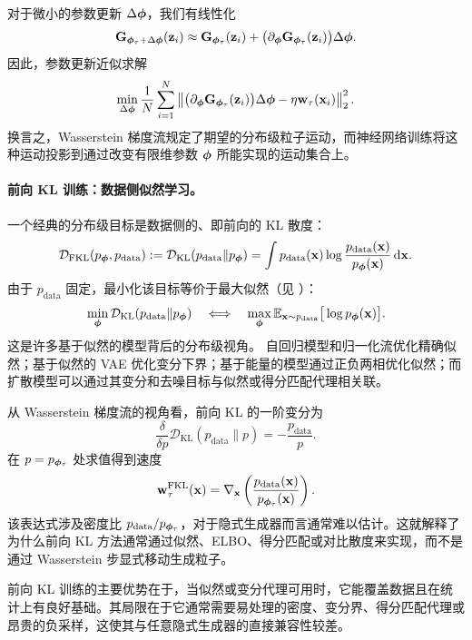 对于微小的参数更新 $\Delta{\bm{\phi}}$，我们有线性化
\[
    {\mathbf{G}}_{{\bm{\phi}}_\tau+\Delta{\bm{\phi}}}({\mathbf{z}}_i)
    \approx
    {\mathbf{G}}_{{\bm{\phi}}_\tau}({\mathbf{z}}_i)
    +
    \big(\partial_{{\bm{\phi}}}{\mathbf{G}}_{{\bm{\phi}}_\tau}({\mathbf{z}}_i)\big)\Delta{\bm{\phi}}.
\]
因此，参数更新近似求解
\[
    \min_{\Delta{\bm{\phi}}}
    \frac{1}{N}
    \sum_{i=1}^N
    \left\|
        \big(\partial_{{\bm{\phi}}}{\mathbf{G}}_{{\bm{\phi}}_\tau}({\mathbf{z}}_i)\big)\Delta{\bm{\phi}}
        -
        \eta{\mathbf{w}}_\tau({\mathbf{x}}_i)
    \right\|_2^2.
\]
换言之，Wasserstein 梯度流规定了期望的分布级粒子运动，而神经网络训练将这种运动投影到通过改变有限维参数 ${\bm{\phi}}$ 所能实现的运动集合上。

\paragraph{前向 KL 训练：数据侧似然学习。}
一个经典的分布级目标是数据侧的、即前向的 KL 散度：
\[
    \mathcal{D}_{\mathrm{FKL}}(p_{{\bm{\phi}}},p_{\mathrm{data}})
    :=
    \mathcal D_{\mathrm{KL}}(p_{\mathrm{data}}\|p_{{\bm{\phi}}})
    =
    \int
    p_{\mathrm{data}}({\mathbf{x}})
    \log
    \frac{p_{\mathrm{data}}({\mathbf{x}})}{p_{{\bm{\phi}}}({\mathbf{x}})}
    \mathop{}\!\mathrm{d}{\mathbf{x}}.
\]
由于 $p_{\mathrm{data}}$ 固定，最小化该目标等价于最大似然（见 ）：
\[
    \min_{{\bm{\phi}}}
    \mathcal D_{\mathrm{KL}}(p_{\mathrm{data}}\|p_{{\bm{\phi}}})
    \quad
    \Longleftrightarrow
    \quad
    \max_{{\bm{\phi}}}
    \mathbb{E}_{{\mathbf{x}}\sim p_{\mathrm{data}}}
    \big[
        \log p_{{\bm{\phi}}}({\mathbf{x}})
    \big].
\]
这是许多基于似然的模型背后的分布级视角。
自回归模型和归一化流优化精确似然；基于似然的 VAE 优化变分下界；基于能量的模型通过正负两相优化似然；而扩散模型可以通过其变分和去噪目标与似然或得分匹配代理相关联。

从 Wasserstein 梯度流的视角看，前向 KL 的一阶变分为
\[
    \frac{\delta}{\delta p}
    \mathcal D_{\mathrm{KL}}(p_{\mathrm{data}}\|p)
    =
    -
    \frac{p_{\mathrm{data}}}{p}.
\]
在 $p=p_{{\bm{\phi}}_\tau}$ 处求值得到速度
\[
    {\mathbf{w}}_\tau^{\mathrm{FKL}}({\mathbf{x}})
    =
    \nabla_{{\mathbf{x}}}
    \left(
        \frac{p_{\mathrm{data}}({\mathbf{x}})}
             {p_{{\bm{\phi}}_\tau}({\mathbf{x}})}
    \right).
\]
该表达式涉及密度比 $p_{\mathrm{data}}/p_{{\bm{\phi}}_\tau}$，对于隐式生成器而言通常难以估计。这就解释了为什么前向 KL 方法通常通过似然、ELBO、得分匹配或对比散度来实现，而不是通过 Wasserstein 步显式移动生成粒子。

前向 KL 训练的主要优势在于，当似然或变分代理可用时，它能覆盖数据且在统计上有良好基础。其局限在于它通常需要易处理的密度、变分界、得分匹配代理或昂贵的负采样，这使其与任意隐式生成器的直接兼容性较差。

